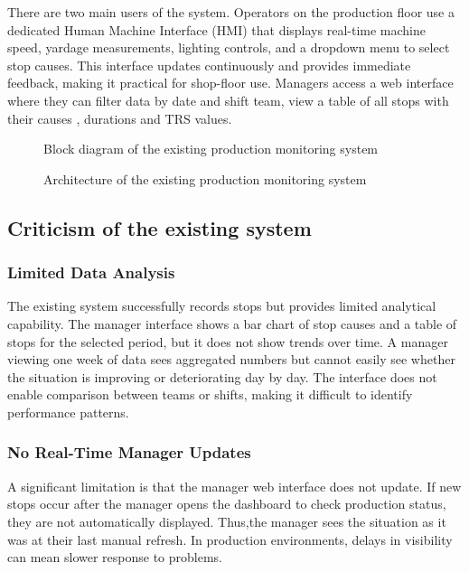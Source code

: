 There are two main users of the system. Operators on the production floor use a dedicated Human Machine Interface (HMI) that displays real-time machine speed, yardage measurements, lighting controls, and a dropdown menu to select stop causes. This interface updates continuously and provides immediate feedback, making it practical for shop-floor use. Managers access a web interface where they can filter data by date and shift team, view a table of all stops with their causes , durations and TRS values.

\begin{figure}[H]
\centering
{}
\caption{Block diagram of the  existing production monitoring system}
\label{fig:chapter1-3}
\end{figure}

\begin{figure}[H]
\centering
{}
\caption{Architecture of the existing production monitoring system}
\label{fig:chapter1-4}
\end{figure}

\subsection{\fontsize{14}{17}\selectfont Criticism of the existing system}

\subsubsection{\fontsize{13}{16}\selectfont Limited Data Analysis}

\hspace*{\parindent} The existing system successfully records stops but provides limited analytical capability. The manager interface shows a bar chart of stop causes and a table of stops for the selected period, but it does not show trends over time. A manager viewing one week of data sees aggregated numbers but cannot easily see whether the situation is improving or deteriorating day by day. The interface does not enable comparison between teams or shifts, making it difficult to identify performance patterns.

\subsubsection{\fontsize{13}{16}\selectfont No Real-Time Manager Updates}

\hspace*{\parindent} A significant limitation is that the manager web interface does not update. If new stops occur after the manager opens the dashboard to check production status, they are not automatically displayed. Thus,the manager sees the situation as it was at their last manual refresh. In production environments, delays in visibility can mean slower response to problems.

